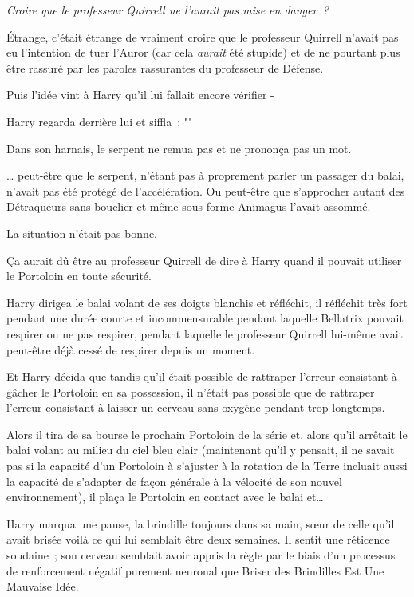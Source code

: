 \emph{Croire que le professeur Quirrell ne l'aurait pas mise en danger~?}

Étrange, c'était étrange de vraiment croire que le professeur Quirrell n'avait pas eu l'intention de tuer l'Auror (car cela \emph{aurait} été stupide) et de ne pourtant plus être rassuré par les paroles rassurantes du professeur de Défense.

Puis l'idée vint à Harry qu'il lui fallait encore vérifier -

Harry regarda derrière lui et siffla~: ""

Dans son harnais, le serpent ne remua pas et ne prononça pas un mot.

… peut-être que le serpent, n'étant pas à proprement parler un passager du balai, n'avait pas été protégé de l'accélération. Ou peut-être que s'approcher autant des Détraqueurs sans bouclier et même sous forme Animagus l'avait assommé.

La situation n'était pas bonne.

Ça aurait dû être au professeur Quirrell de dire à Harry quand il pouvait utiliser le Portoloin en toute sécurité.

Harry dirigea le balai volant de ses doigts blanchis et réfléchit, il réfléchit très fort pendant une durée courte et incommensurable pendant laquelle Bellatrix pouvait respirer ou ne pas respirer, pendant laquelle le professeur Quirrell lui-même avait peut-être déjà cessé de respirer depuis un moment.

Et Harry décida que tandis qu'il était possible de rattraper l'erreur consistant à gâcher le Portoloin en sa possession, il n'était pas possible que de rattraper l'erreur consistant à laisser un cerveau sans oxygène pendant trop longtemps.

Alors il tira de sa bourse le prochain Portoloin de la série et, alors qu'il arrêtait le balai volant au milieu du ciel bleu clair (maintenant qu'il y pensait, il ne savait pas si la capacité d'un Portoloin à s'ajuster à la rotation de la Terre incluait aussi la capacité de s'adapter de façon générale à la vélocité de son nouvel environnement), il plaça le Portoloin en contact avec le balai et…

Harry marqua une pause, la brindille toujours dans sa main, sœur de celle qu'il avait brisée voilà ce qui lui semblait être deux semaines. Il sentit une réticence soudaine~; son cerveau semblait avoir appris la règle par le biais d'un processus de renforcement négatif purement neuronal que Briser des Brindilles Est Une Mauvaise Idée.

